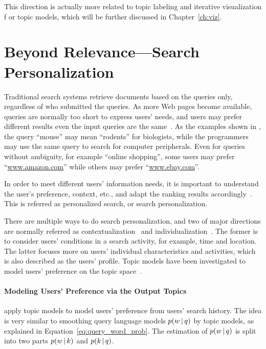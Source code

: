 This direction is actually more related to topic labeling and iterative visualization f
or topic models, which will be further discussed in Chapter~\ref{ch:viz}.

\section{Beyond Relevance---Search Personalization}

Traditional search systems retrieve documents based on the queries only, regardless of who submitted the queries.
As more Web pages become available, queries are normally too short to express users' needs, and
users may prefer different results even the input queries are the same~\citep{Jansen-2000,Dou-2007}.
As the examples shown in \citet{Dou-2007}, the query ``mouse'' may mean ``rodents'' for biologists, 
while the programmers may use the same query to search for computer peripherals. Even for queries without
ambiguity, for example ``online shopping'', some users may prefer ``\url{www.amazon.com}'' while others may
prefer ``\url{www.ebay.com}''.

In order to meet different users' information needs, it is important to understand the user's preference, context,
etc., and adapt the ranking results accordingly~\citep{Pitkow-2002,Micarelli-2007}.
This is referred as personalized search, or search personalization.

There are multiple ways to do search personalization, and two of major directions are normally referred as contextualization~\citep{Melucci-2012,} 
and individualization~\citep{Pitkow-2002}. The former is to consider users' conditions in a search activity, for example, time and location.
The latter focuses more on users' individual characteristics and activities, which is also described as the users' profile.
Topic models have been investigated to model users' preference on the topic space~\citep{Song-2010,Carman-2010}.

\paragraph{Modeling Users' Preference via the Output Topics}

\citet{Song-2010} apply topic models to model users' preference from
users' search history. The idea is very similar to smoothing query
language models $p(w \, | \, q)$ by topic models, as explained in Equation~\ref{eq:query_word_prob}. The estimation of $p(w \, | \, q)$ is split into two parts $p(w \, | \, k)$ and $p(k \, | \, q)$.


